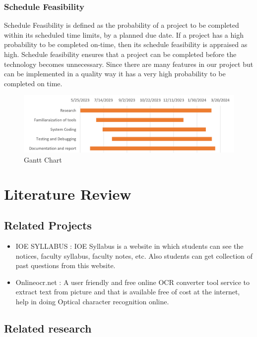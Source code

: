 \subsection{Schedule Feasibility}
Schedule Feasibility is defined as the probability of a project to be completed within its 
scheduled time limits, by a planned due date. If a project has a high probability to be 
completed on-time, then its schedule feasibility is appraised as high. Schedule 
feasibility ensures that a project can be completed before the technology becomes 
unnecessary. Since there are many features in our project but can be implemented in a 
quality way it has a very high probability to be completed on time.
\begin{figure}[h!]
    \includegraphics[scale=0.7]{images/Ganttchart.png}
    \caption{Gantt Chart}
    \label{fig:my_label}
\end{figure}



\chapter{Literature Review}
\section{Related Projects}

	\begin{itemize}
		\item IOE SYLLABUS : IOE Syllabus is a website in which students can see the notices, faculty syllabus, faculty 
notes, etc. Also students can get collection of past questions from this website.
			\item Onlineocr.net : A user friendly and free online OCR converter tool service to extract text from picture 
and that is available free of cost at the internet, help in doing Optical character 
recognition online.
		
\end{itemize}
\section{Related research}

